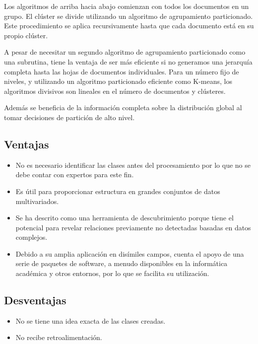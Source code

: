 \documentclass{llncs}
\begin{document}
\vspace{0.5em}
Los algoritmos de arriba hacia abajo comienzan con todos los documentos en un grupo. El clúster se divide utilizando un algoritmo de agrupamiento particionado. Este procedimiento se aplica recursivamente hasta que cada documento está en su
propio clúster.

A pesar de necesitar un segundo algoritmo de agrupamiento particionado como una subrutina, tiene la ventaja de ser más eficiente si no generamos una jerarquía completa hasta las hojas de documentos individuales. Para un número fijo de niveles, y utilizando un algoritmo particionado eficiente como K-means, los algoritmos divisivos son lineales en el número de documentos y clústeres.

Adem\'as se beneficia de la información completa sobre la distribución global al tomar decisiones de partición de alto nivel.

\subsection{Ventajas} 

\begin{itemize}
	\item No es necesario identificar las clases antes del procesamiento por lo que no se debe contar con expertos para este fin.
	
	\item Es útil para proporcionar estructura en grandes conjuntos de datos multivariados.
	
	\item Se ha descrito como una herramienta de descubrimiento porque tiene el potencial para revelar relaciones previamente no detectadas basadas en datos complejos.
	
	\item Debido a su amplia aplicación en dis\'imiles campos, cuenta el apoyo de una serie de paquetes de software, a menudo disponibles en la informática académica y otros entornos, por lo que se facilita su utilizaci\'on.
\end{itemize}

\subsection{Desventajas} 
	\begin{itemize}
		\item No se tiene una idea exacta de las clases creadas.
		\item No recibe retroalimentaci\'on.
	\end{itemize}
\end{document}
